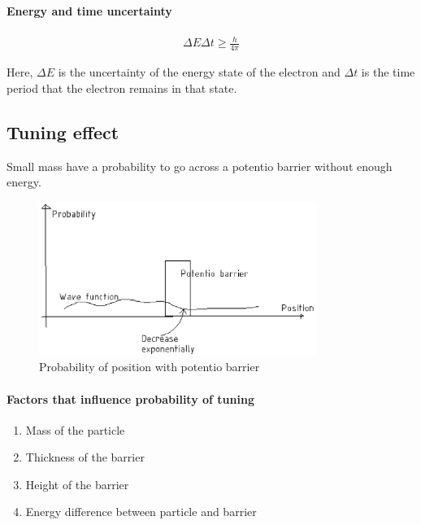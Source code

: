         \paragraph{Energy and time uncertainty}
            \begin{align}
                \Delta E \Delta t \ge \frac{h}{4 \pi}
            \end{align}

            Here, $\Delta E$ is the uncertainty of the energy state of the electron and $\Delta t$ is the time period that the electron remains in that state.
    
    \subsection{Tuning effect}
        Small mass have a probability to go across a potentio barrier without enough energy.

        \begin{figure}[H]
            \begin{center}
                \includegraphics[height=5cm]{quantum_charts/tun_eff_prob.eps}
            \end{center}
            \caption{Probability of position with potentio barrier}
            \label{tun_eff_pppb}
        \end{figure}

        \paragraph{Factors that influence probability of tuning}
        \begin{enumerate}
            \item Mass of the particle
            \item Thickness of the barrier
            \item Height of the barrier
            \item Energy difference between particle and barrier 
        \end{enumerate}

